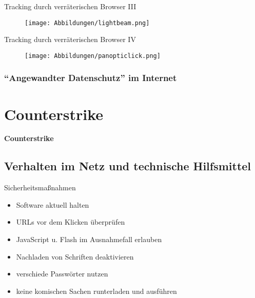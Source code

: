 \documentclass[hyperref={colorlinks,linkcolor=white}, utf8]{beamer}
\begin{document}
	\begin{frame}{Tracking durch verräterischen Browser III}
		\begin{figure}[V]
			\texttt{[image: Abbildungen/lightbeam.png]}
			\label{fig:lightbeam}
		\end{figure}
	\end{frame}
	
	\begin{frame}{Tracking durch verräterischen Browser IV}
		\begin{figure}[V]
			\texttt{[image: Abbildungen/panopticlick.png]}
			\label{fig:panopticlick}
		\end{figure}
	\end{frame}
	
	\subsubsection{\enquote{Angewandter Datenschutz} im Internet}
	
	\section{Counterstrike}
	\begin{frame}
		\centering \huge \textbf{Counterstrike}
	\end{frame}
	
	
	\subsection{Verhalten im Netz und technische Hilfsmittel}
		\begin{frame}{Sicherheitsmaßnahmen}
			\begin{itemize}
				\item Software aktuell halten
				\item URLs vor dem Klicken überprüfen
				\item JavaScript u. Flash im Ausnahmefall erlauben
				\item Nachladen von Schriften deaktivieren
				\item verschiede Passwörter nutzen
				\item keine komischen Sachen runterladen und ausführen
			\end{itemize}
		\end{frame}
	
\end{document}
